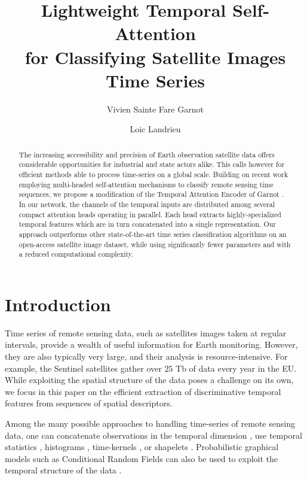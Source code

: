 \documentclass[runningheads]{llncs}
\begin{document}
\title{Lightweight Temporal Self-Attention  \\ for Classifying Satellite Images Time Series}
\author{Vivien Sainte Fare Garnot \and
Loic Landrieu
}
\maketitle              \begin{abstract}
The increasing accessibility and precision of Earth observation satellite data offers considerable opportunities for industrial and state actors alike. This calls however for efficient methods able to process time-series on a global scale.
Building on recent work employing multi-headed self-attention mechanisms to classify remote sensing time sequences, we propose a modification of the Temporal Attention Encoder of Garnot \etal \cite{garnot2019satellite}.
In our network, the channels of the temporal inputs are distributed among several compact attention heads operating in parallel. Each head extracts highly-specialized temporal features which are in turn concatenated into a single representation.
Our approach outperforms other state-of-the-art time series classification algorithms on an open-access satellite image dataset, while using significantly fewer parameters and with a reduced computational complexity.
\end{abstract}
\section{Introduction}
Time series of remote sensing data, such as satellites images taken at regular intervals, provide a wealth of useful information for Earth monitoring. However, they are also typically very large, and their analysis is resource-intensive. For example, the Sentinel satellites gather over $25$ Tb of data every year in the EU. While exploiting the spatial structure of the data poses a challenge on its own, we focus in this paper on the efficient extraction of discriminative temporal features from sequences of spatial descriptors.

Among the many possible approaches to handling time-series of remote sensing data, one can concatenate observations in the temporal dimension \cite{kussul2016parcel}, use temporal statistics \cite{pelletier2016assessing}, histograms \cite{bailly2015dense}, time-kernels \cite{tavenard2017efficient}, or shapelets \cite{ye2009time}. Probabilistic graphical models such as Conditional Random Fields can also be used to exploit the temporal structure of the data \cite{bailly2018crop}.
\end{document}
